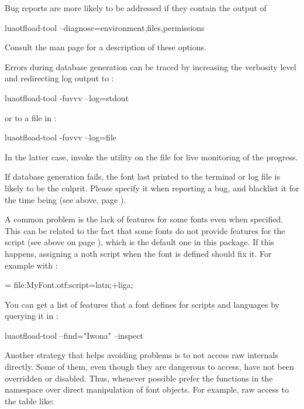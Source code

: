 Bug reports are more likely to be addressed if they contain the output
of

\beginlisting
    luaotfload-tool --diagnose=environment,files,permissions
\endlisting

\noindent Consult the man page for a description of these options.

Errors during database generation can be traced by increasing the
verbosity level and redirecting log output to :

\beginlisting
    luaotfload-tool -fuvvv --log=stdout
\endlisting

\noindent or to a file in :

\beginlisting
    luaotfload-tool -fuvvv --log=file
\endlisting

\noindent In the latter case, invoke the  utility on the
file for live monitoring of the progress.

If database generation fails, the font last printed to the terminal or
log file is likely to be the culprit.
%
Please specify it when reporting a bug, and blacklist it for the time
being (see above, page \pageref{font-blacklist}).

\endsubsection


A common problem is the lack of features for some
\OpenType fonts even when specified.
%
This can be related to the fact that some fonts do not provide features
for the  script (see above on page \pageref{script-tag}),
which is the default one in this package.
%
If this happens, assigning a noth script when the font is defined should
fix it.
%
For example with :

\beginlisting
    \font \test = file:MyFont.otf:script=latn;+liga;
\endlisting

You can get a list of features that a font defines for scripts and
languages by querying it in :

\beginlisting
    luaotfload-tool --find="Iwona" --inspect
\endlisting

\endsubsection


Another strategy that helps avoiding problems is to not access raw
\LUATEX internals directly.
%
Some of them, even though they are dangerous to access, have not been
overridden or disabled.
%
Thus, whenever possible prefer the functions in the 
namespace over direct manipulation of font objects. For example, raw
access to the  table like:


